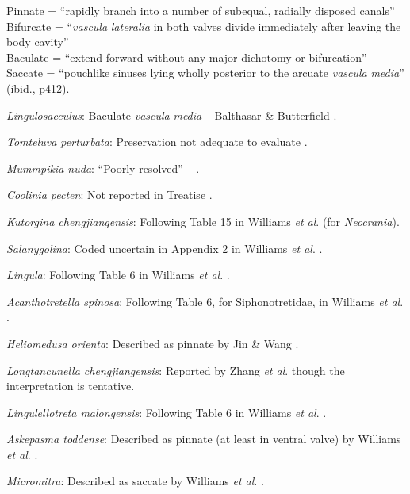 \documentclass[]{book}
\theoremstyle{definition}
\theoremstyle{definition}
\theoremstyle{definition}
\theoremstyle{remark}
\begin{document}
Pinnate = ``rapidly branch into a number of subequal, radially disposed
canals''\\
Bifurcate = ``\emph{vascula} \emph{lateralia} in both valves divide
immediately after leaving the body cavity''\\
Baculate = ``extend forward without any major dichotomy or bifurcation''
\citep[ p.~418]{Williams1997BrachiopodaRevised}\\
Saccate = ``pouchlike sinuses lying wholly posterior to the arcuate
\emph{vascula} \emph{media}'' (ibid., p412).

\emph{Lingulosacculus}: Baculate \emph{vascula} \emph{media} --
Balthasar \& Butterfield \citeyearpar{Balthasar2009EarlyCambrian}.

\emph{Tomteluva perturbata}: Preservation not adequate to evaluate
\citep{Streng2016Anew}.

\emph{Mummpikia nuda}: ``Poorly resolved'' --
\citet{Balthasar2008iMummpikia}.

\emph{Coolinia pecten}: Not reported in Treatise
\citep{Williams2000BrachiopodaLinguliformea}.

\emph{Kutorgina chengjiangensis}: Following Table 15 in Williams
\emph{et al}. \citeyearpar{Williams2000BrachiopodaLinguliformea} (for
\emph{Neocrania}).

\emph{Salanygolina}: Coded uncertain in Appendix 2 in Williams \emph{et
al}. \citeyearpar{Williams1998Thediversity}.

\emph{Lingula}: Following Table 6 in Williams \emph{et al}.
\citeyearpar{Williams2000BrachiopodaLinguliformea}.

\emph{Acanthotretella spinosa}: Following Table 6, for Siphonotretidae,
in Williams \emph{et al}.
\citeyearpar{Williams2000BrachiopodaLinguliformea}.

\emph{Heliomedusa orienta}: Described as pinnate by Jin \& Wang
\citeyearpar{Jin1992Revisionof}.

\emph{Longtancunella chengjiangensis}: Reported by Zhang \emph{et al}.
\citeyearpar[2011T]{Zhang2007Agregarious} though the interpretation is
tentative.

\emph{Lingulellotreta malongensis}: Following Table 6 in Williams
\emph{et al}. \citeyearpar{Williams2000BrachiopodaLinguliformea}.

\emph{Askepasma toddense}: Described as pinnate (at least in ventral
valve) by Williams \emph{et al}.
\citeyearpar[p.~250]{Williams1998Thediversity}.

\emph{Micromitra}: Described as saccate by Williams \emph{et al}.
\citeyearpar{Williams1998Thediversity}.
\end{document}
